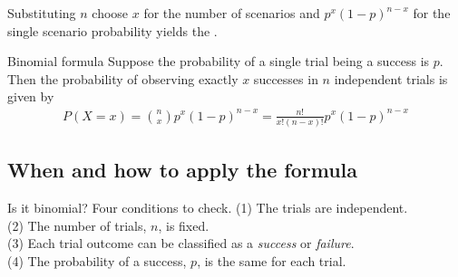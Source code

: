 Substituting $n$ choose $x$ for the number of scenarios
and $p^x(1-p)^{n-x}$ for the single scenario probability
yields the .

\begin{onebox}{Binomial formula}
Suppose the probability of a single trial being a success is $p$. Then the probability of observing exactly $x$ successes in $n$ independent trials is given by\vspace{-1mm}
\begin{eqnarray*}
P(X=x)={n\choose x}p^x(1-p)^{n-x} = \frac{n!}{x!(n-x)!}p^x(1-p)^{n-x}
\label{binomialFormula}
\end{eqnarray*}
\end{onebox}


\D{\newpage}

\subsection{When and how to apply the formula}

\begin{onebox}{Is it binomial? Four conditions to check.}
  \label{isItBinomialTipBox}%
  (1) The trials are independent. \\
  (2) The number of trials, $n$, is fixed. \\
  (3) Each trial outcome can be classified as a \emph{success}
      or \emph{failure}. \\
  (4) The probability of a success, $p$, is the same for
      each trial.
\end{onebox}

